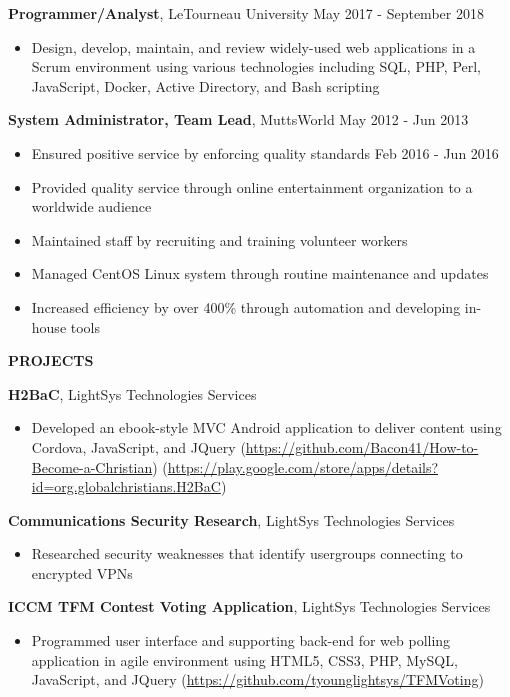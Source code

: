 \documentclass[letterpaper]{article}
\newcommand{\altsection}[1]{\noindent\textbf{#1}\smallskip}
\newcommand{\entry}[3]{\textbf{#1}, #2\begin{itemize}[leftmargin=3.5em]#3\end{itemize}\bigskip}
\begin{document}
\entry{Programmer/Analyst}{LeTourneau University                 \hfill          May 2017 - September 2018} {
    \item Design, develop, maintain, and review widely-used web applications in a Scrum environment using various technologies including SQL, PHP, Perl, JavaScript, Docker, Active Directory, and Bash scripting
}

\entry{System Administrator, Team Lead}{MuttsWorld                             \hfill          May 2012 - Jun 2013}  {
    \item Ensured positive service by enforcing quality standards       \hfill          Feb 2016 - Jun 2016
    \item Provided quality service through online entertainment organization to a worldwide audience
    \item Maintained staff by recruiting and training volunteer workers
    \item Managed CentOS Linux system through routine maintenance and updates
    \item Increased efficiency by over 400\% through automation and developing in-house tools
}

\altsection{PROJECTS}


\entry{H2BaC}{LightSys Technologies Services} {
    \item Developed an ebook-style MVC Android application to deliver content using Cordova, JavaScript, and JQuery (\url{https://github.com/Bacon41/How-to-Become-a-Christian}) (\url{https://play.google.com/store/apps/details?id=org.globalchristians.H2BaC})
}

\entry{Communications Security Research}{LightSys Technologies Services}{
    \item Researched security weaknesses that identify usergroups connecting to encrypted VPNs
}

\entry{ICCM TFM Contest Voting Application}{LightSys Technologies Services} {
    \item Programmed user interface and supporting back-end for web polling application in agile environment using HTML5, CSS3, PHP, MySQL, JavaScript, and JQuery (\url{https://github.com/tyounglightsys/TFMVoting})
}
\end{document}

